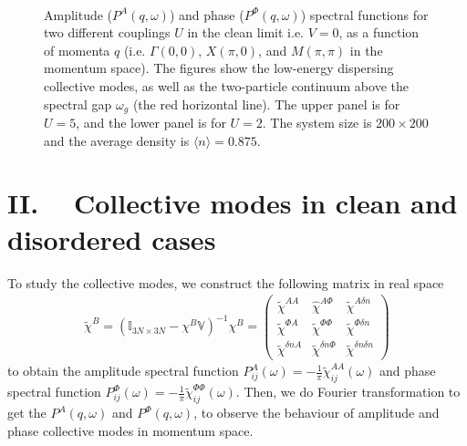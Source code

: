 \documentclass[Colective.tex]{revtex4-1}
\begin{document}
\begin{figure}[H]
	\begin{center}
		\\
		\caption{Amplitude ($P^A(q,\omega)$) and phase ($P^\Phi(q,\omega)$) spectral functions for two different couplings $U$ in the clean limit i.e. $V= 0$, as a function of momenta $q$ (i.e. $\Gamma (0,0)$, $X (\pi,0)$, and $M (\pi,\pi)$ in the momentum space). The figures show the low-energy dispersing collective modes, as well as the two-particle continuum above the spectral gap $\omega_g$ (the red horizontal line). The upper panel is for $U=5$, and the lower panel is for $U=2$. The system size is $200\times200$ and the average density is $\langle n \rangle =0.875$.} \label{Fig.amp_pha_U5_2}
	\end{center}
\end{figure}


\section{II.\,\,\,\,\,\,      Collective modes in clean and disordered cases}
To study the collective modes, we construct the following matrix in real space
\begin{align}
\tilde{\chi}^B = \left(\mathbb{I}_{3N\times 3N}-\chi^B \mathbb{V}\right)^{-1}\chi^B = 
\left(\begin{array}{ccc}
\tilde{\chi}^{AA} & \hat{\chi}^{A\Phi} & \tilde{\chi}^{A\delta n} \\
\tilde{\chi}^{\Phi A} & \tilde{\chi}^{\Phi \Phi} & \tilde{\chi}^{\Phi \delta n} \\
\tilde{\chi}^{\delta n A} & \tilde{\chi}^{\delta n\Phi} & \tilde{\chi}^{\delta n\delta n}
\end{array}\right)
\label{eq.RPA_SM}
\end{align}
to obtain the amplitude spectral function $P_{ij}^A(\omega) = - \frac{1}{\pi}\tilde{\chi}_{ij}^{AA}(\omega) $ and phase spectral function $P_{ij}^\Phi(\omega) = - \frac{1}{\pi}\tilde{\chi}^{\Phi \Phi}_{ij}(\omega) $. Then, we do Fourier transformation to get the $P^A(q,\omega)$ and $P^\Phi(q,\omega)$, to observe the behaviour of amplitude and phase collective modes in momentum space.
\end{document}
